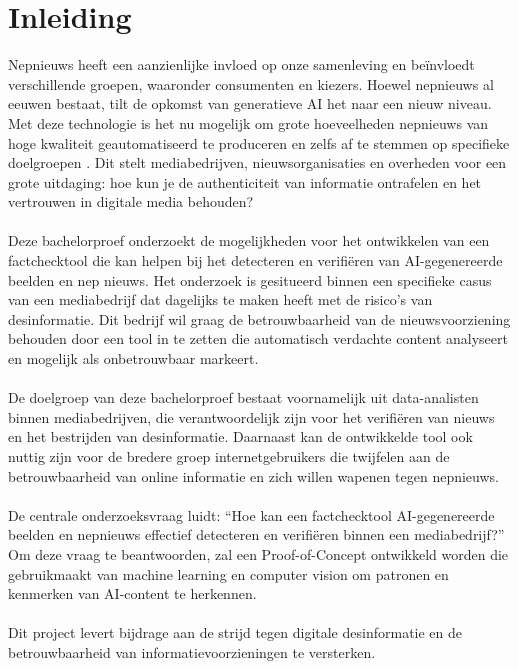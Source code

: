 
\section{Inleiding}%
\label{sec:inleiding}

\noindent
Nepnieuws heeft een aanzienlijke invloed op onze samenleving en beïnvloedt verschillende groepen, waaronder consumenten en kiezers. Hoewel nepnieuws al eeuwen bestaat, tilt de opkomst van generatieve AI het naar een nieuw niveau. Met deze technologie is het nu mogelijk om grote hoeveelheden nepnieuws van hoge kwaliteit geautomatiseerd te produceren en zelfs af te stemmen op specifieke doelgroepen \autocite{Loth2024}. Dit stelt mediabedrijven, nieuwsorganisaties en overheden voor een grote uitdaging: hoe kun je de authenticiteit van informatie ontrafelen en het vertrouwen in digitale media behouden?
\\ \\
Deze bachelorproef onderzoekt de mogelijkheden voor het ontwikkelen van een factchecktool die kan helpen bij het detecteren en verifiëren van AI-gegenereerde beelden en nep nieuws. Het onderzoek is gesitueerd binnen een specifieke casus van een mediabedrijf dat dagelijks te maken heeft met de risico’s van desinformatie. Dit bedrijf wil graag de betrouwbaarheid van de nieuwsvoorziening behouden door een tool in te zetten die automatisch verdachte content analyseert en mogelijk als onbetrouwbaar markeert.
\\ \\
De doelgroep van deze bachelorproef bestaat voornamelijk uit data-analisten binnen mediabedrijven, die verantwoordelijk zijn voor het verifiëren van nieuws en het bestrijden van desinformatie. Daarnaast kan de ontwikkelde tool ook nuttig zijn voor de bredere groep internetgebruikers die twijfelen aan de betrouwbaarheid van online informatie en zich willen wapenen tegen nepnieuws.
\\ \\
De centrale onderzoeksvraag luidt: “Hoe kan een factchecktool AI-gegenereerde beelden en nepnieuws effectief detecteren en verifiëren binnen een mediabedrijf?” Om deze vraag te beantwoorden, zal een Proof-of-Concept ontwikkeld worden die gebruikmaakt van machine learning en computer vision om patronen en kenmerken van AI-content te herkennen.
\\ \\
Dit project levert bijdrage aan de strijd tegen digitale desinformatie en de betrouwbaarheid van informatievoorzieningen te versterken. 


